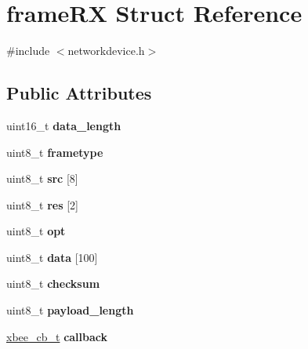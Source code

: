 \hypertarget{structframe_r_x}{}\section{frame\+RX Struct Reference}
\label{structframe_r_x}


{\ttfamily \#include $<$networkdevice.\+h$>$}

\subsection*{Public Attributes}
\begin{DoxyCompactItemize}
\item 
\mbox{\label{structframe_r_x_af463ce209cea0fd24f7e20c1a51f7fc6}} 
uint16\+\_\+t {\bfseries data\+\_\+length}
\item 
\mbox{\label{structframe_r_x_a4684f3a419d7c6eaf5bded40cec73cdf}} 
uint8\+\_\+t {\bfseries frametype}
\item 
\mbox{\label{structframe_r_x_a4a465dedf00b5d81f2f337c987b0ce96}} 
uint8\+\_\+t {\bfseries src} \mbox{[}8\mbox{]}
\item 
\mbox{\label{structframe_r_x_a339160d2b3a24b3db0ea4318fc36227c}} 
uint8\+\_\+t {\bfseries res} \mbox{[}2\mbox{]}
\item 
\mbox{\label{structframe_r_x_a46a068d1f1deb22e9e415b1ced537516}} 
uint8\+\_\+t {\bfseries opt}
\item 
\mbox{\label{structframe_r_x_afdb061e4b3b406bf4890e95de2fbf474}} 
uint8\+\_\+t {\bfseries data} \mbox{[}100\mbox{]}
\item 
\mbox{\label{structframe_r_x_a2ef590f48976b2550c7e12f2accf1e2f}} 
uint8\+\_\+t {\bfseries checksum}
\item 
\mbox{\label{structframe_r_x_a8ffb1ad18c41d6943c8172042f965123}} 
uint8\+\_\+t {\bfseries payload\+\_\+length}
\item 
\mbox{\label{structframe_r_x_a9483c0994c50cd55141215e73a75b95b}} 
\hyperlink{networkdevice_8h_a6234cefbfc9f98d18078b749c2615a1f}{xbee\+\_\+cb\+\_\+t} {\bfseries callback}
\end{DoxyCompactItemize}


